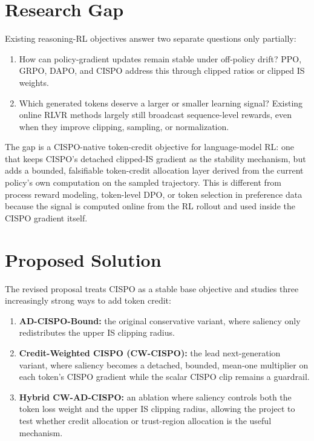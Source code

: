 \documentclass[11pt]{article}
\begin{document}
\section{Research Gap}

Existing reasoning-RL objectives answer two separate questions only partially:
\begin{enumerate}[leftmargin=*]
  \item How can policy-gradient updates remain stable under off-policy drift?
  PPO, GRPO, DAPO, and CISPO address this through clipped ratios or clipped
  IS weights.
  \item Which generated tokens deserve a larger or smaller learning signal?
  Existing online RLVR methods largely still broadcast sequence-level rewards,
  even when they improve clipping, sampling, or normalization.
\end{enumerate}

The gap is a CISPO-native token-credit objective for language-model RL: one
that keeps CISPO's detached clipped-IS gradient as the stability mechanism, but
adds a bounded, falsifiable token-credit allocation layer derived from the
current policy's own computation on the sampled trajectory. This is different
from process reward modeling, token-level DPO, or token selection in
preference data because the signal is computed online from the RL rollout and
used inside the CISPO gradient itself.

\section{Proposed Solution}

The revised proposal treats CISPO as a stable base objective and studies three
increasingly strong ways to add token credit:
\begin{enumerate}[leftmargin=*]
  \item \textbf{AD-CISPO-Bound:} the original conservative variant, where
  saliency only redistributes the upper IS clipping radius.
  \item \textbf{Credit-Weighted CISPO (CW-CISPO):} the lead next-generation
  variant, where saliency becomes a detached, bounded, mean-one multiplier on
  each token's CISPO gradient while the scalar CISPO clip remains a guardrail.
  \item \textbf{Hybrid CW-AD-CISPO:} an ablation where saliency controls both
  the token loss weight and the upper IS clipping radius, allowing the project
  to test whether credit allocation or trust-region allocation is the useful
  mechanism.
\end{enumerate}
\end{document}
